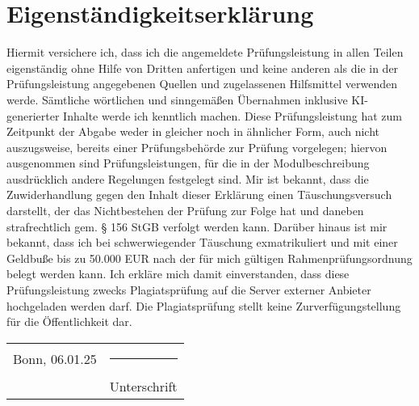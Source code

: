 \newpage
{} %

\section*{Eigenständigkeitserklärung}

\noindent Hiermit versichere ich, dass ich die angemeldete Prüfungsleistung in allen Teilen eigen\-ständig ohne Hilfe von Dritten anfertigen und keine anderen als die in der Prüfungsleis\-tung angegebenen Quellen und zugelassenen Hilfsmittel verwenden werde. Sämtliche wörtlichen und sinngemäßen Übernahmen inklusive KI-generierter Inhalte werde ich kenntlich machen. Diese Prüfungsleistung hat zum Zeitpunkt der Abgabe weder in glei\-cher noch in ähnlicher Form, auch nicht auszugsweise, bereits einer Prüfungsbehörde zur Prüfung vorgelegen; hiervon ausgenommen sind Prüfungsleistungen, für die in der Mo\-dulbeschreibung ausdrücklich andere Regelungen festgelegt sind. Mir ist bekannt, dass die Zuwiderhandlung gegen den Inhalt dieser Erklärung einen Täuschungsversuch dar\-stellt, der das Nichtbestehen der Prüfung zur Folge hat und daneben strafrechtlich gem. § 156 StGB verfolgt werden kann. Darüber hinaus ist mir bekannt, dass ich bei schwerwie\-gender Täuschung exmatrikuliert und mit einer Geldbuße bis zu 50.000 EUR nach der für mich gültigen Rahmenprüfungsordnung belegt werden kann. Ich erkläre mich damit ein\-verstanden, dass diese Prüfungsleistung zwecks Plagiatsprüfung auf die Server externer Anbieter hochgeladen werden darf. Die Plagiatsprüfung stellt keine Zurverfügungstellung für die Öffentlichkeit dar.

\vspace{2cm}

\noindent\begin{tabular}{@{}p{}@{}p{}@{}}
{\raggedleft Bonn, 06.01.25} & {\raggedright\rule{5cm}{0.4pt}} \\
& {\raggedright Unterschrift}
\end{tabular}



\vspace{5cm}

